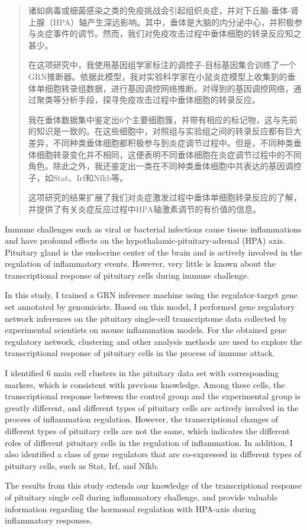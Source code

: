 
\begin{abstract}
  诸如病毒或细菌感染之类的免疫挑战会引起组织炎症，并对下丘脑-垂体-肾上腺（HPA）轴产生深远影响。其中，垂体是大脑的内分泌中心，并积极参与炎症事件的调节。然而，我们对免疫攻击过程中垂体细胞的转录反应知之甚少。

  在这项研究中，我使用基因组学家标注的调控子-目标基因集合训练了一个GRN推断器。依据此模型，我对实验科学家在小鼠炎症模型上收集到的垂体单细胞转录组数据，进行基因调控网络推断。对得到的基因调控网络，通过聚类等分析手段，探寻免疫攻击过程中垂体细胞的转录反应。

  我在垂体数据集中鉴定出6个主要细胞簇，并带有相应的标记物，这与先前的知识是一致的。在这些细胞中，对照组与实验组之间的转录反应都有巨大差异，不同种类垂体细胞都积极参与到炎症调节过程中。但是，不同种类垂体细胞转录变化并不相同，这便表明不同垂体细胞在炎症调节过程中的不同角色。除此之外，我还鉴定出一类在不同种类垂体细胞中共表达的基因调控子，如Stat、Irf和Nfkb等。

  这项研究的结果扩展了我们对炎症激发过程中垂体单细胞转录反应的了解，并提供了有关炎症反应过程中HPA轴激素调节的有价值的信息。
\end{abstract}

\begin{abstract*}
  Immune challenges such as viral or bacterial infections cause tissue inflammations and have profound effects on the hypothalamic-pituitary-adrenal (HPA) axis. Pituitary gland is the endocrine center of the brain and is actively involved in the regulation of inflammatory events. However, very little is known about the transcriptional response of pituitary cells during immune challenge.

  In this study, I trained a GRN inference machine using the regulator-target gene set annotated by genomicists. Based on this model, I performed gene regulatory network inferences on the pituitary single-cell transcriptome data collected by experimental scientists on mouse inflammation models. For the obtained gene regulatory network, clustering and other analysis methods are used to explore the transcriptional response of pituitary cells in the process of immune attack.

  I identified 6 main cell clusters in the pituitary data set with corresponding markers, which is consistent with previous knowledge. Among these cells, the transcriptional response between the control group and the experimental group is greatly different, and different types of pituitary cells are actively involved in the process of inflammation regulation. However, the transcriptional changes of different types of pituitary cells are not the same, which indicates the different roles of different pituitary cells in the regulation of inflammation. In addition, I also identified a class of gene regulators that are co-expressed in different types of pituitary cells, such as Stat, Irf, and Nfkb.

  The results from this study extends our knowledge of the transcriptional response of pituitary single cell during inflammatory challenge, and provide valuable information regarding the hormonal regulation with HPA-axis during inflammatory responses.
\end{abstract*}

